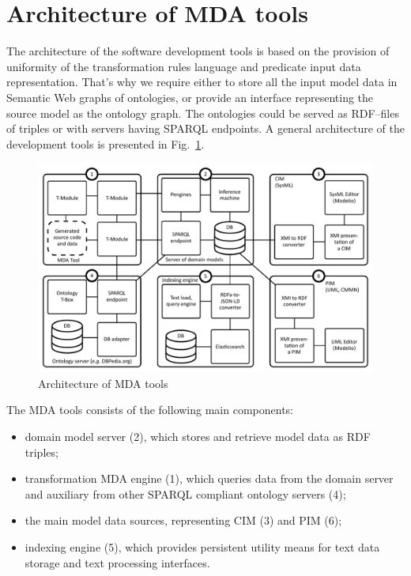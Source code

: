 \documentclass[conference]{IEEEtran}
\begin{document}
\section{Architecture of MDA tools}


The architecture of the software development tools is based on the provision of uniformity of the transformation rules language and predicate input data representation.  That's why we require either to store all the input model data in Semantic Web graphs of ontologies, or provide an interface representing the source model as the ontology graph.  The ontologies could be served as RDF--files of triples or with servers having SPARQL endpoints.  A general architecture of the development tools is presented in Fig.~\ref{fig:archi}.

\begin{figure}[htb]
  \centering
   \includegraphics[width=1\linewidth]{pics/architecture-mda-lod-ext.pdf}
  \caption{Architecture of MDA tools}
  \label{fig:archi}
\end{figure}

The MDA tools consists of the following main components:
\begin{itemize}
\item domain model server (2), which stores and retrieve model data as RDF triples;
\item transformation MDA engine (1), which queries data from the domain server and auxiliary from other SPARQL compliant ontology servers (4);
\item the main model data sources, representing CIM (3) and PIM (6);
\item indexing engine (5), which provides persistent utility means for text data storage and text processing interfaces.
\end{itemize}
\end{document}
